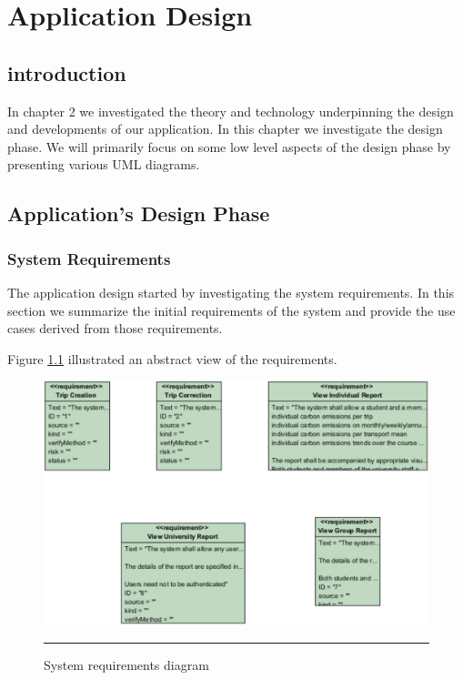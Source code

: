 
\chapter{Application Design} %
\label{Application Design}

\section{introduction}

In chapter 2 we investigated the theory and technology underpinning the design and developments of our application. In this chapter we investigate the design phase. We will primarily focus on some low level aspects of the design phase by presenting various UML diagrams.

\section{Application's Design Phase}

\subsection{System Requirements}

The application design started by investigating the system requirements. In this section we summarize the initial requirements of the system and provide the use cases derived from those requirements.

Figure \ref{fig:sysRequirementsDiagram} illustrated an abstract view of the requirements.

\begin{figure}[htbp]
	\centering
		\includegraphics[scale=0.60]{./Figures/chapter4/figure1.pdf}
		\rule{35em}{0.5pt}
	\caption[System requirements diagram]{System requirements diagram}
	\label{fig:sysRequirementsDiagram}
\end{figure}

